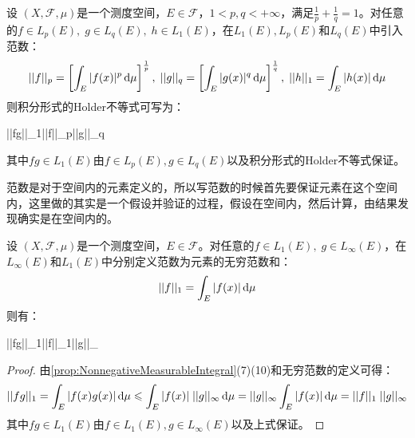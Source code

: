 \begin{theorem}
	设	$(X,\mathscr{F},\mu)$是一个测度空间，$E\in\mathscr{F}$，$1<p,q<+\infty$，满足$\frac{1}{p}+\frac{1}{q}=1$。对任意的$f\in L_p(E),\;g\in L_q(E),\;h\in L_1(E)$，在$L_1(E),L_p(E)$和$L_q(E)$中引入范数：
	\begin{equation*}
		||f||_p=\left[\int_{E}^{}|f(x)|^p\mathop{}\!\mathrm{d}\mu\right]^\frac{1}{p},\;||g||_q=\left[\int_{E}|g(x)|^q\mathop{}\!\mathrm{d}\mu\right]^{\frac{1}{q}},\;||h||_1=\int_{E}|h(x)|\mathop{}\!\mathrm{d}\mu
	\end{equation*}
	则积分形式的Holder不等式可写为：
	\begin{inequality*}\label{ineq:holder-ineq-norm}
		||fg||_1\leqslant||f||_p\;||g||_q
	\end{inequality*}
	其中$fg\in L_1(E)$由$f\in L_p(E),g\in L_q(E)$以及积分形式的Holder不等式保证。
\end{theorem}
\begin{note}
	范数是对于空间内的元素定义的，所以写范数的时候首先要保证元素在这个空间内，这里做的其实是一个假设并验证的过程，假设在空间内，然后计算，由结果发现确实是在空间内的。
\end{note}
\begin{theorem}
	设	$(X,\mathscr{F},\mu)$是一个测度空间，$E\in\mathscr{F}$。对任意的$f\in L_1(E),\;g\in L_{\infty}(E)$，在$L_{\infty}(E)$和$L_1(E)$中分别定义范数为元素的无穷范数和：
	\begin{equation*}
		||f||_1=\int_{E}|f(x)|\mathop{}\!\mathrm{d}\mu
	\end{equation*}
	则有：
	\begin{inequality*}\label{ineq:holder-ineq-norm+infty}
		||fg||_1\leqslant||f||_1\;||g||_{\infty}
	\end{inequality*}
\end{theorem}
\begin{proof}
	由\cref{prop:NonnegativeMeasurableIntegral}(7)(10)和无穷范数的定义可得：
	\begin{equation*}
		||fg||_1=\int_{E}|f(x)g(x)|\mathop{}\!\mathrm{d}\mu\leqslant\int_{E}|f(x)|\;||g||_{\infty}\mathop{}\!\mathrm{d}\mu=||g||_{\infty}\int_{E}|f(x)|\mathop{}\!\mathrm{d}\mu=||f||_1\;||g||_{\infty}\qedhere
	\end{equation*}
	其中$fg\in L_1(E)$由$f\in L_1(E),g\in L_{\infty}(E)$以及上式保证。
\end{proof}






